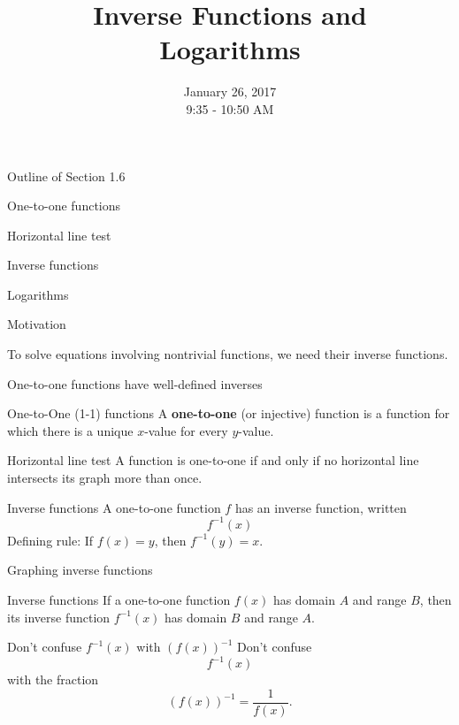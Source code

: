 \documentclass[t]{beamer}
\title{Inverse Functions and \\
Logarithms}
\date{January 26, 2017 \\ 9:35 - 10:50 AM}
\newenvironment{fpi}
  {\itemize[nolistsep,itemsep=\fill]}
  {\vfill\enditemize}
\begin{document}
\frame{\titlepage}


\begin{frame}{Outline of Section 1.6}
\begin{fpi}
\item One-to-one functions
\item Horizontal line test
\item Inverse functions
\item Logarithms
\end{fpi}
\end{frame}

\begin{frame}{Motivation}
\begin{fpi}
\item To solve equations involving nontrivial functions, we need their inverse functions.
\item One-to-one functions have well-defined inverses
\end{fpi}
\end{frame}

\begin{frame}{One-to-One (1-1) functions}
A \textbf{one-to-one} (or injective) function is a function for which there is a unique $x$-value for every $y$-value.
\end{frame}

\begin{frame}{Horizontal line test}
A function is one-to-one if and only if no horizontal line intersects its graph more than once.
\end{frame}

\begin{frame}{Inverse functions}
A one-to-one function $f$ has an inverse function, written
$$f^{-1}(x)$$
Defining rule: If $f(x) = y$, then $f^{-1}(y) = x$.
\end{frame}

\begin{frame}{Graphing inverse functions}
\end{frame}

\begin{frame}{Inverse functions}
If a one-to-one function $f(x)$ has domain $A$ and range $B$, then 
its inverse function $f^{-1}(x)$ has domain $B$ and range $A$.
\end{frame}



\begin{frame}{Don't confuse $f^{-1}(x)$ with $(f(x))^{-1}$}
Don't confuse
$$f^{-1}(x)$$
with the fraction
$$(f(x))^{-1} = \frac{1}{f(x)}.$$
\end{frame}
\end{document}
